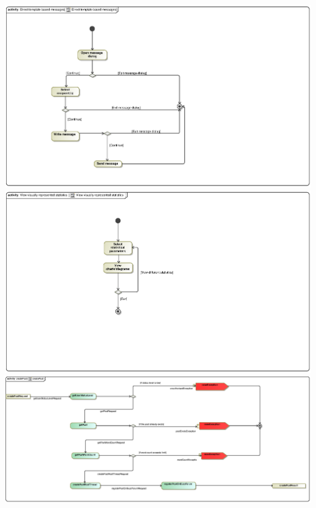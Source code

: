 \documentclass{scrreprt}
\begin{document}
\includegraphics[scale=.9]{seanAC.eps}\\
\includegraphics[scale=.9]{seanAC1.eps}\\
\includegraphics[scale=.9]{Shaun_activity.eps}\\
\end{document}
